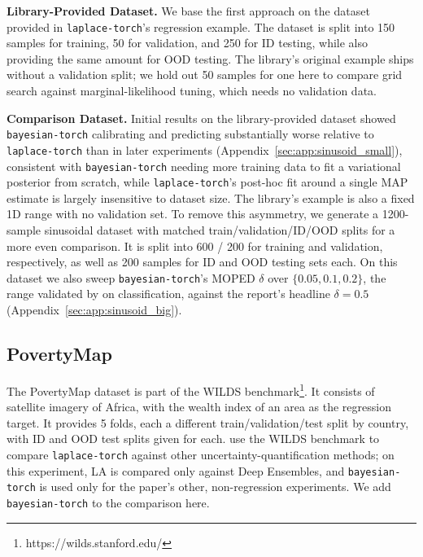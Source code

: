 \documentclass[conference]{IEEEtran}
\begin{document}
\textbf{Library-Provided Dataset.} We base the first approach on the dataset provided in
\texttt{laplace-torch}'s regression example. The dataset is split into 150 samples for training, 50 for
validation, and 250 for ID testing, while also providing the same amount
for OOD testing.
The library's original example ships without a validation split; we hold out 50 samples for
one here to compare grid search against marginal-likelihood tuning, which needs no
validation data.

\textbf{Comparison Dataset.} Initial results on the library-provided dataset showed
\texttt{bayesian-torch} calibrating and predicting substantially worse relative to
\texttt{laplace-torch} than in later experiments (Appendix~\ref{sec:app:sinusoid_small}),
consistent with \texttt{bayesian-torch} needing more training data to fit a variational
posterior from scratch, while \texttt{laplace-torch}'s post-hoc fit around a single MAP
estimate is largely insensitive to dataset size. The library's example is also a fixed 1D
range with no validation set. To remove this asymmetry, we generate a 1200-sample
sinusoidal dataset with matched train/validation/ID/OOD splits for a more even comparison.
It is split into 600 / 200 for training and validation,
respectively, as well as 200 samples for ID and OOD testing sets each. On this dataset we
also sweep \texttt{bayesian-torch}'s MOPED $\delta$ over $\{0.05, 0.1, 0.2\}$, the range
validated by \citet{krishnan2020specifying} on classification, against the report's headline
$\delta=0.5$ (Appendix~\ref{sec:app:sinusoid_big}).


\subsection{PovertyMap}

The PovertyMap dataset is part of the WILDS benchmark\footnote{https://wilds.stanford.edu/}.
It consists of satellite imagery of Africa, with the wealth index of an area as the
regression target. It provides 5 folds, each a different train/validation/test split by
country, with ID and OOD test splits given for each. \citet{daxberger2021laplace} use the
WILDS benchmark to compare \texttt{laplace-torch} against other uncertainty-quantification
methods; on this experiment, LA is compared only against Deep Ensembles, and
\texttt{bayesian-torch} is used only for the paper's other, non-regression experiments. We
add \texttt{bayesian-torch} to the comparison here.
\end{document}
